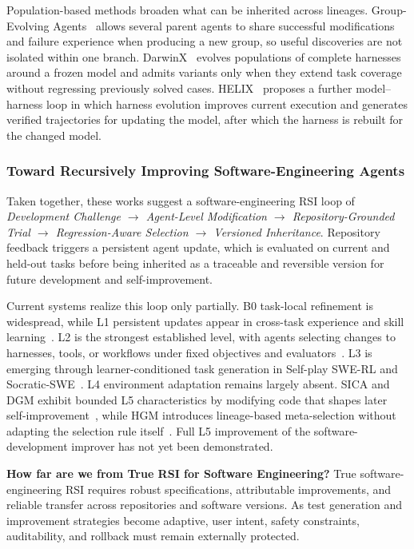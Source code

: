 Population-based methods broaden what can be inherited across lineages. Group-Evolving Agents~\cite{weng2026gea} allows several parent agents to share successful modifications and failure experience when producing a new group, so useful discoveries are not isolated within one branch. DarwinX~\cite{zhang2026darwinx} evolves populations of complete harnesses around a frozen model and admits variants only when they extend task coverage without regressing previously solved cases. HELIX~\cite{fan2026helix} proposes a further model--harness loop in which harness evolution improves current execution and generates verified trajectories for updating the model, after which the harness is rebuilt for the changed model.


\subsubsection{Toward Recursively Improving Software-Engineering Agents}

Taken together, these works suggest a software-engineering RSI loop of \emph{Development Challenge $\rightarrow$ Agent-Level Modification $\rightarrow$ Repository-Grounded Trial $\rightarrow$ Regression-Aware Selection $\rightarrow$ Versioned Inheritance}. Repository feedback triggers a persistent agent update, which is evaluated on current and held-out tasks before being inherited as a traceable and reversible version for future development and self-improvement.

Current systems realize this loop only partially. B0 task-local refinement is widespread, while L1 persistent updates appear in cross-task experience and skill learning~\cite{chen2026sweexp,li2026codeskill}. L2 is the strongest established level, with agents selecting changes to harnesses, tools, or workflows under fixed objectives and evaluators~\cite{zhang2026selfharness,lin2026ahe,zhang2026darwinx}. L3 is emerging through learner-conditioned task generation in Self-play SWE-RL and Socratic-SWE~\cite{wei2025selfplayswerl,xiao2026socraticswe}. L4 environment adaptation remains largely absent. SICA and DGM exhibit bounded L5 characteristics by modifying code that shapes later self-improvement~\cite{robeyns2025sica,zhang2026dgm}, while HGM introduces lineage-based meta-selection without adapting the selection rule itself~\cite{wang2026hgm}. Full L5 improvement of the software-development improver has not yet been demonstrated.

\begin{tcolorbox}[
   width=\linewidth,
   colback=gray!7,
   colframe=gray!45,
   boxrule=0.9pt,
   arc=2mm,
   outer arc=2mm,
   left=7pt,
   right=7pt,
   top=5pt,
   bottom=5pt,
   boxsep=0pt,
   before skip=5pt,
   after skip=5pt
]
\textbf{How far are we from True RSI for Software Engineering?}
True software-engineering RSI requires robust specifications, attributable improvements, and reliable transfer across repositories and software versions. As test generation and improvement strategies become adaptive, user intent, safety constraints, auditability, and rollback must remain externally protected.
\end{tcolorbox}




